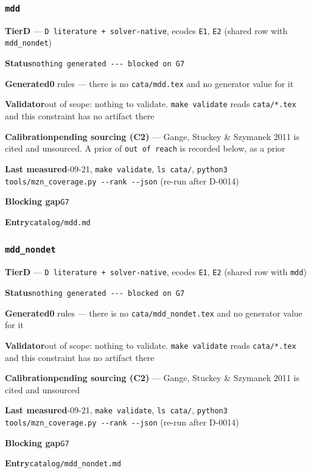 \documentclass[10pt,a4paper]{article}
\newcommand{\entryfield}[2]{{\raggedright\textbf{#1}\quad #2\par}}
\begin{document}
\subsubsection*{\texttt{mdd}}
\label{entry:mdd}
\entryfield{Tier}{\textbf{D} --- \texttt{D literature + solver-\allowbreak{}native}, ecodes \texttt{E1}, \texttt{E2} (shared row with \texttt{mdd\_nondet})}
\entryfield{Status}{\texttt{nothing generated -\allowbreak{}-\allowbreak{}-\allowbreak{} blocked on G7}}
\entryfield{Generated}{\textbf{0} rules --- there is no \texttt{cata/mdd.tex} and no generator value for it}
\entryfield{Validator}{out of scope: nothing to validate. \texttt{make validate} reads \texttt{cata/*.tex} and this constraint has no artifact there}
\entryfield{Calibration}{\textbf{pending sourcing (C2)} --- Gange, Stuckey \& Szymanek 2011 is cited and unsourced. A prior of \texttt{out of reach} is recorded below, as a prior}
\entryfield{Last measured}{2026-09-21, \texttt{make validate}, \texttt{ls cata/}, \texttt{python3 tools/\allowbreak{}mzn\_\allowbreak{}coverage.\allowbreak{}py -\allowbreak{}-\allowbreak{}rank -\allowbreak{}-\allowbreak{}json} (re-run after D-0014)}
\entryfield{Blocking gap}{\texttt{G7}}
\entryfield{Entry}{\texttt{catalog/mdd.md}}
\subsubsection*{\texttt{mdd\_\allowbreak{}nondet}}
\label{entry:mdd-nondet}
\entryfield{Tier}{\textbf{D} --- \texttt{D literature + solver-\allowbreak{}native}, ecodes \texttt{E1}, \texttt{E2} (shared row with \texttt{mdd})}
\entryfield{Status}{\texttt{nothing generated -\allowbreak{}-\allowbreak{}-\allowbreak{} blocked on G7}}
\entryfield{Generated}{\textbf{0} rules --- there is no \texttt{cata/mdd\_nondet.tex} and no generator value for it}
\entryfield{Validator}{out of scope: nothing to validate. \texttt{make validate} reads \texttt{cata/*.tex} and this constraint has no artifact there}
\entryfield{Calibration}{\textbf{pending sourcing (C2)} --- Gange, Stuckey \& Szymanek 2011 is cited and unsourced}
\entryfield{Last measured}{2026-09-21, \texttt{make validate}, \texttt{ls cata/}, \texttt{python3 tools/\allowbreak{}mzn\_\allowbreak{}coverage.\allowbreak{}py -\allowbreak{}-\allowbreak{}rank -\allowbreak{}-\allowbreak{}json} (re-run after D-0014)}
\entryfield{Blocking gap}{\texttt{G7}}
\entryfield{Entry}{\texttt{catalog/mdd\_nondet.md}}
\end{document}
